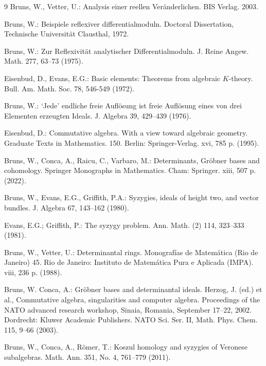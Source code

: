\documentclass[10pt]{amsart}
\begin{document}
	\begin{thebibliography}{9}
		 Bruns, W., Vetter, U.: Analysis einer reellen Ver\"{a}nderlichen. BIS Verlag. 2003.
		
		 Bruns, W.: Beispiele reflexiver differentialmoduln. Doctoral Dissertation, Technische Universit\"{a}t Clausthal, 1972.
		
		 Bruns, W.: Zur Reflexivit\"{a}t analytischer Differentialmoduln. J. Reine Angew. Math. 277, 63--73 (1975).
		
		 Eisenbud, D., Evans, E.G.: Basic elements: Theorems from algebraic $K$-theory. Bull. Am. Math. Soc. 78, 546-549 (1972).
		
		 Bruns, W.: `Jede' endliche freie Aufl\"{o}sung ist freie Aufl\"{o}sung eines von drei Elementen erzeugten Ideals. J. Algebra 39, 429--439 (1976).
		
		 Eisenbud, D.: Commutative algebra. With a view toward algebraic geometry. Graduate Texts in Mathematics. 150. Berlin: Springer-Verlag. xvi, 785 p. (1995).
		
		 Bruns, W., Conca, A., Raicu, C., Varbaro, M.: Determinants, Gr\"{o}bner bases and cohomology. Springer Monographs in Mathematics. Cham: Springer. xiii, 507 p. (2022).
		
		 Bruns, W., Evans, E.G., Griffith, P.A.: Syzygies, ideals of height two, and vector bundles. J. Algebra 67, 143--162 (1980).
		
		 Evans, E.G.; Griffith, P.: The syzygy problem. Ann. Math. (2) 114, 323--333 (1981).
		
		 Bruns, W., Vetter, U.: Determinantal rings. Monograf\'{i}as de Matem\'{a}tica (Rio de Janeiro) 45. Rio de Janeiro: Instituto de Matem\'{a}tica Pura e Aplicada (IMPA). viii, 236 p. (1988).
		
		 Bruns, W. Conca, A.: Gr\"{o}bner bases and determinantal ideals. Herzog, J. (ed.) et al., Commutative algebra, singularities and computer algebra. Proceedings of the NATO advanced research workshop, Sinaia, Romania, September 17--22, 2002. Dordrecht: Kluwer Academic Publishers. NATO Sci. Ser. II, Math. Phys. Chem. 115, 9--66 (2003).
		
		 Bruns, W., Conca, A., R\"{o}mer, T.: Koszul homology and syzygies of Veronese subalgebras. Math. Ann. 351, No. 4, 761--779 (2011).
		

\end{thebibliography}
\end{document}
